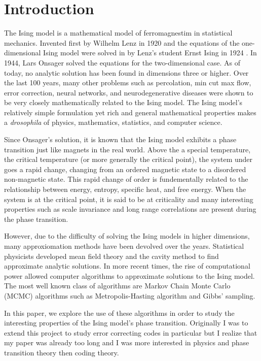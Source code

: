\documentclass{article}
\begin{document}
\section{Introduction}
\label{Introduction}
    The Ising model is a mathematical model of ferromagnestim in statistical mechanics.
    Invented first by Wilhelm Lenz in 1920 \cite{Lenz1920} and the equations of the one-dimensional Ising model were solved in by
    Lenz's student Ernst Ising in 1924 \cite{Ising1925}. In 1944, Lars Onsager \cite{Onsager1944} solved the equations for the two-dimensional case. 
    As of today, no analytic solution has been found in dimensions three or higher. Over the last 100 years, many other problems such as percolation, min cut max flow, error correction, neural networks, and neurodegenerative diseases were
    shown to be very closely mathematically related to the Ising model. 
    The Ising model's relatively simple formulation yet rich and general mathematical properties makes a \textit{drosophila} of physics, mathematics, statistics, and computer science.

    Since Onsager's solution, it is known that the Ising model exhibits a phase transition just like magnets in the real world. Above the
    a special temperature, the critical temperature (or more generally the critical point), the system under goes a rapid change, changing from an ordered magnetic state to a disordered non-magnetic state. 
    This rapid change of order is fundementally related to the relationship between energy, entropy, specific heat, and free energy. When the system is at the critical point, it is said to be at
    criticality and many interesting properties such as scale invariance and long range correlations are present
    during the phase transition. 

    However, due to the difficulty of solving the Ising models in higher dimensions, many approxiomation methods have been devolved over the years. 
    Statistical physicists developed mean field theory and the cavity method to find approximate analytic solutions. In more recent times, the rise of computational 
    power allowed computer algorithms to approximate solutions to the Ising model. The most well known class of algorithms are Markov Chain Monte Carlo (MCMC) algorithms such as 
    Metropolis-Hasting algorithm and Gibbs' sampling. 
    
    In this paper, we explore the use of these algorithms in order to study the interesting properties of the Ising model's phase transition. Originally I was to extend
    this project to study error correcting codes in particular but I realize that my paper was already too long and I was more interested in physics and phase transition theory
    then coding theory.
\end{document}
